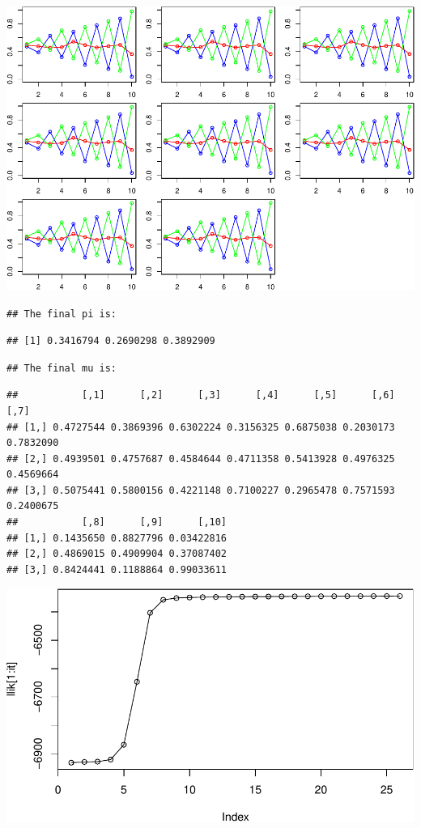 \documentclass[
]{article}
\begin{document}
\includegraphics{MLLab1block2-lepeng_files/figure-latex/Assignment2_3-3.pdf}

\begin{verbatim}
## The final pi is:
\end{verbatim}

\begin{verbatim}
## [1] 0.3416794 0.2690298 0.3892909
\end{verbatim}

\begin{verbatim}
## The final mu is:
\end{verbatim}

\begin{verbatim}
##           [,1]      [,2]      [,3]      [,4]      [,5]      [,6]      [,7]
## [1,] 0.4727544 0.3869396 0.6302224 0.3156325 0.6875038 0.2030173 0.7832090
## [2,] 0.4939501 0.4757687 0.4584644 0.4711358 0.5413928 0.4976325 0.4569664
## [3,] 0.5075441 0.5800156 0.4221148 0.7100227 0.2965478 0.7571593 0.2400675
##           [,8]      [,9]      [,10]
## [1,] 0.1435650 0.8827796 0.03422816
## [2,] 0.4869015 0.4909904 0.37087402
## [3,] 0.8424441 0.1188864 0.99033611
\end{verbatim}

\includegraphics{MLLab1block2-lepeng_files/figure-latex/Assignment2_4-1.pdf}
\end{document}
